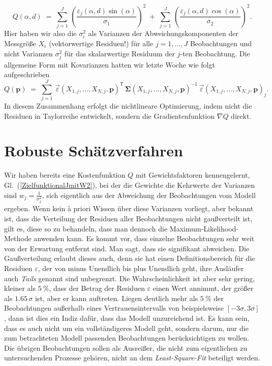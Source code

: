 \begin{equation}
Q(\alpha, d) \; = \;
\sum\limits_{j=1}^J \,  \left(\frac{\varepsilon_j(\alpha, d) \sin(\alpha)}{\sigma_1}\right)^2
\; + \; \sum\limits_{j=1}^J \, \left(\frac{\varepsilon_j(\alpha, d) \cos(\alpha)}{\sigma_2}\right)^2 .
\end{equation}
Hier haben wir also die $\sigma_i^2$ als Varianzen der Abweichungskomponenten
der Messgröße $X_i$ (vektorwertige Residuen!) für alle $j=1,\dots,J$ Beobachtungen
und nicht Varianzen $\sigma_j^2$ für das skalarwertige Residuum der $j$-ten Beobachtung.
Die allgemeine Form mit Kovarianzen hatten wir letzte Woche wie folgt aufgeschrieben
\begin{equation}
Q(\mathbf{p}) \; = \;
 \sum\limits_{j=1}^J \, \vec \varepsilon(X_{1,j},\dots,X_{N,j},\mathbf{p})^\mathsf{T} \, 
\boldsymbol{\Sigma}(X_{1,j},\dots,X_{N,j},\mathbf{p})^{-1} \, \vec \varepsilon(X_{1,j},\dots,X_{N,j},\mathbf{p})_j .
\label{generalLSmethod}
\end{equation}
In diesem Zusammenhang erfolgt die nichtlineare Optimierung, indem nicht
die Residuen in Taylorreihe entwickelt, sondern die Gradientenfunktion $\nabla Q$ direkt.


\section{Robuste Schätzverfahren}

Wir haben bereits eine Kostenfunktion $Q$ mit Gewichtsfaktoren kennengelernt, Gl.~(\ref{ZielfunktionalJmitW2}),
bei der die Gewichte die Kehrwerte der Varianzen sind $w_j = \frac{1}{\sigma_j^2}$, sich eigentlich
aus der Abweichung der Beobachtungen vom Modell ergeben. Wenn kein {\`a} priori Wissen über
diese Varianzen vorliegt, aber bekannt ist, dass die Verteilung der
Residuen aller Beobachtungen nicht gauß\-ver\-teilt ist, gilt es, diese so zu behandeln, dass man
dennoch die Maximum-Likelihood-Methode anwenden kann. Es kommt vor, dass einzelne Beobachtungen
sehr weit von der Erwartung entfernt sind. Man sagt, dass sie signifikant abweichen. Die Gaußverteilung
erlaubt dieses auch, denn sie hat einen Definitionsbereich für die Residuen $\varepsilon$,
der von minus Unendlich bis plus Unendlich geht, ihre Ausläufer auch \textsl{Tails} genannt
sind unbegrenzt. Die Wahrscheinlichkeit ist aber sehr gering, kleiner als $5~\%$, dass der Betrag der
Residuen $\varepsilon$ einen Wert annimmt, der größer als
$1.65 \, \sigma$ ist, aber er kann auftreten. Liegen deutlich mehr als $5~\%$
der Beobachtungen außerhalb eines Vertrauensintervalls von beispielsweise $[-3 \sigma, 3 \sigma]$,
dann ist dies ein Indiz dafür, dass das Modell unzureichend ist. Es kann sein, dass es auch nicht
um ein vollständigeres Modell geht, sondern darum, nur die zum betrachteten Modell passenden Beobachtungen
berücksichtigen zu wollen. Die übrigen Beobachtungen sollen als Ausreißer, die nicht zum
eigentlichen zu untersuchenden Prozesse gehören, nicht an dem \textsl{Least-Square-Fit}
beteiligt werden.

